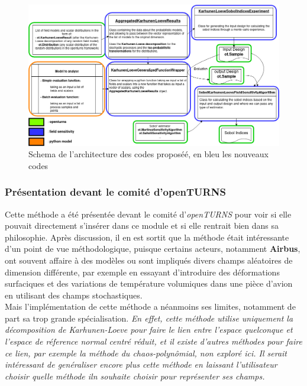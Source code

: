 \documentclass[a4paper,10pt]{article}
\begin{document}
\begin{figure}[H]
   \centering   
   \hspace*{-1.5in}
   \noindent \includegraphics[scale=0.55]{DiagrammeExtensionOT.png}
      \caption{Schema de l'architecture des codes proposéé, en bleu les nouveaux codes}
         \label{SchemaArchitectureCodes}
\end{figure}


\subsubsection{Présentation devant le comité d'openTURNS}

Cette méthode a été présentée devant le comité d'\textit{openTURNS} pour voir si elle pouvait directement s'insérer dans ce module et si elle rentrait bien dans sa philosophie. Après discussion, il en est sortit que la méthode était intéressante d'un point de vue méthodologique, puisque certains acteurs, notamment \textbf{Airbus}, ont souvent affaire à des modèles ou sont impliqués divers champs aléatoires de dimension différente, par exemple en essayant d'introduire des déformations surfaciques et des variations de température volumiques dans une pièce d'avion en utilisant des champs stochastiques. \\
Mais l'implémentation de cette méthode a néanmoins ses limites, notamment de part sa trop grande spécialisation. \emph{En effet, cette méthode utilise uniquement la décomposition de Karhunen-Loeve pour faire le lien entre l'espace quelconque et l'espace de réference normal centré réduit, et il existe d'autres méthodes pour faire ce lien, par exemple la méthode du chaos-polynômial, non exploré ici. Il serait intéressant de genéraliser encore plus cette méthode en laissant l'utilisateur choisir quelle méthode iln souhaite choisir pour représenter ses champs.}
\end{document}

